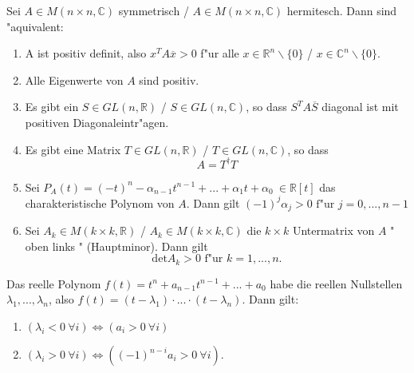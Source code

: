 \documentclass[9pt, a4paper, twocolumn, landscape]{article}
\newcommand{\comment}[1]{}
\begin{document}
\begin{theorem}
Sei $A \in M (n \times n, \mathbb{C})$ symmetrisch /  $A \in M (n \times n, \mathbb{C})$ hermitesch. Dann sind "aquivalent:
\begin{enumerate}
\item A ist positiv definit, also $x^TA\overline{x} > 0$ f"ur alle $x \in \mathbb{R}^n \backslash \{0\}$ /  $x \in \mathbb{C}^n\backslash \{0\}$.
\item Alle Eigenwerte von $A$ sind positiv.
\item Es gibt ein $S \in GL(n, \mathbb{R})$ / $S \in GL(n, \mathbb{C})$, so dass $S^TA\overline{S}$ diagonal ist mit positiven Diagonaleintr"agen.
\item Es gibt eine Matrix $T \in GL(n, \mathbb{R})$ / $T \in GL(n, \mathbb{C})$, so dass
$$
A = T^\dagger T
$$
\item Sei $P_A(t) = (-t)^n - \alpha_{n-1}t^{n-1} + ... + \alpha_1 t + \alpha_0 \ \in \mathbb{R} [t]$ das charakteristische Polynom von $A$. Dann gilt 
$
(-1)^j\alpha_j > 0 \text{ f"ur } j = 0, ..., n-1
$
\item Sei $A_k  \in M(k \times k, \mathbb{R})$ / $A_k  \in M(k \times k, \mathbb{C})$ die $k \times k$ Untermatrix von $A$ " oben links " (Hauptminor). Dann gilt
$$
\mathrm{det}A_k > 0 \text{ f"ur  } k = 1, ..., n.
$$
\end{enumerate}
\end{theorem}





\comment{
\begin{corollary}
Eine symmetrische Matrix $A \in M(n \times n; \mathbb{R})$ mit dem charakteristischen Polynom $P_A(t) = (-1)^n t^n + \alpha_{n-1}t^{n-1} + ... + \alpha_0$ ist genau dann positiv definit, wenn $(-1)^j \alpha_j > 0$ f"ur $j = 0, ..., n-1$. Das folgt aus folgender Vorzeichenregel.
\end{corollary}
}

\begin{lemma}
Das reelle Polynom $f(t) = t^n + a_{n-1}t^{n-1} + ... +a_0$ habe die reellen Nullstellen $\lambda_1, ..., \lambda_n$, also $f(t) = (t - \lambda_1) \cdot ... \cdot (t - \lambda_n)$. Dann gilt:
\begin{enumerate}
\item $(\lambda_i < 0 \ \forall i) \Leftrightarrow (a_i > 0 \ \forall i)$
\item $(\lambda_i > 0 \ \forall i) \Leftrightarrow ( (-1)^{n-i}a_i > 0 \ \forall i)$.
\end{enumerate}

\end{lemma}
\end{document}
